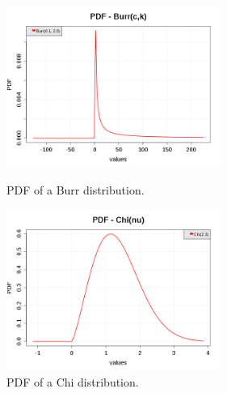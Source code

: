 \begin{figure}[H]
  \begin{minipage}{10cm}
    \begin{center}
      \includegraphics[width=7cm]{pdf_Burr_3.png}
      \caption{PDF of a Burr distribution.}
      \label{PDFBurr3}
    \end{center}
  \end{minipage}
  \hfill
  \begin{minipage}{10cm}
    \begin{center}
      \includegraphics[width=7cm]{pdf_Chi_1.png}
      \caption{PDF of a Chi distribution.}
      \label{PDFChi1}
    \end{center}
  \end{minipage}
\end{figure}


